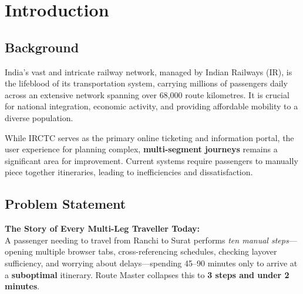 \documentclass[12pt,a4paper]{report}
\begin{document}
\listoftables



\chapter{Introduction}

\section{Background}

India's vast and intricate railway network, managed by Indian Railways (IR), is the lifeblood of its transportation system, carrying millions of passengers daily across an extensive network spanning over 68,000 route kilometres. It is crucial for national integration, economic activity, and providing affordable mobility to a diverse population.

While IRCTC serves as the primary online ticketing and information portal, the user experience for planning complex, \textbf{multi-segment journeys} remains a significant area for improvement. Current systems require passengers to manually piece together itineraries, leading to inefficiencies and dissatisfaction.

\section{Problem Statement}

\begin{tcolorbox}[keybox]
\textbf{The Story of Every Multi-Leg Traveller Today:}\\[0.4em]
A passenger needing to travel from Ranchi to Surat performs \textit{ten manual steps}---opening multiple browser tabs, cross-referencing schedules, checking layover sufficiency, and worrying about delays---spending 45--90 minutes only to arrive at a \textbf{suboptimal} itinerary. Route Master collapses this to \textbf{3 steps and under 2 minutes}.
\end{tcolorbox}
\end{document}
